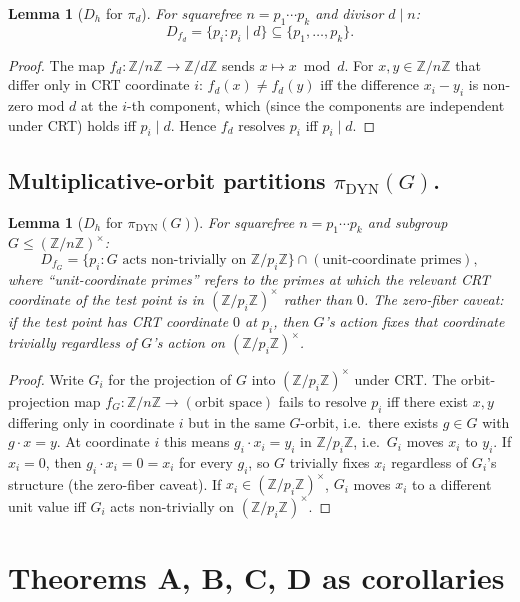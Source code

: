 \documentclass[11pt,reqno]{amsart}
\theoremstyle{plain}
\newtheorem{lemma}[theorem]{Lemma}
\theoremstyle{definition}
\newcommand{\Z}{\mathbb{Z}}
\newcommand{\Zn}{\Z/n\Z}
\newcommand{\Zns}{(\Z/n\Z)^{\times}}
\newcommand{\DYN}{\mathrm{DYN}}
\begin{document}
\begin{lemma}[$D_h$ for $\pi_d$] \label{lem:Dh-add}
For squarefree $n = p_1 \cdots p_k$ and divisor $d \mid n$:
\[
D_{f_d} = \{p_i : p_i \mid d\} \subseteq \{p_1, \ldots, p_k\}.
\]
\end{lemma}

\begin{proof}
The map $f_d : \Zn \to \Z/d\Z$ sends $x \mapsto x \bmod d$. For
$x, y \in \Zn$ that differ only in CRT coordinate $i$:
$f_d(x) \neq f_d(y)$ iff the difference $x_i - y_i$ is non-zero
mod $d$ at the $i$-th component, which (since the components are
independent under CRT) holds iff $p_i \mid d$. Hence $f_d$ resolves
$p_i$ iff $p_i \mid d$.
\end{proof}

\subsection{Multiplicative-orbit partitions $\pi_{\DYN}(G)$.}

\begin{lemma}[$D_h$ for $\pi_{\DYN}(G)$] \label{lem:Dh-mult}
For squarefree $n = p_1 \cdots p_k$ and subgroup $G \leq \Zns$:
\[
D_{f_G} = \{p_i : G \text{ acts non-trivially on } \Z/p_i\Z\} \cap (\text{unit-coordinate primes}),
\]
where ``unit-coordinate primes'' refers to the primes at which the
relevant CRT coordinate of the test point is in
$(\Z/p_i\Z)^{\times}$ rather than $0$. The zero-fiber caveat: if
the test point has CRT coordinate $0$ at $p_i$, then $G$'s action
fixes that coordinate trivially regardless of $G$'s action on
$(\Z/p_i\Z)^{\times}$.
\end{lemma}

\begin{proof}
Write $G_i$ for the projection of $G$ into $(\Z/p_i\Z)^{\times}$
under CRT. The orbit-projection map $f_G \colon \Zn \to (\text{orbit space})$
fails to resolve $p_i$ iff there exist $x, y$ differing only in
coordinate $i$ but in the same $G$-orbit, i.e.\ there exists $g \in G$
with $g \cdot x = y$. At coordinate $i$ this means $g_i \cdot x_i = y_i$
in $\Z/p_i\Z$, i.e.\ $G_i$ moves $x_i$ to $y_i$. If $x_i = 0$, then
$g_i \cdot x_i = 0 = x_i$ for every $g_i$, so $G$ trivially fixes
$x_i$ regardless of $G_i$'s structure (the zero-fiber caveat). If
$x_i \in (\Z/p_i\Z)^{\times}$, $G_i$ moves $x_i$ to a different
unit value iff $G_i$ acts non-trivially on $(\Z/p_i\Z)^{\times}$.
\end{proof}

\section{Theorems A, B, C, D as corollaries} \label{sec:corollaries}
\end{document}
